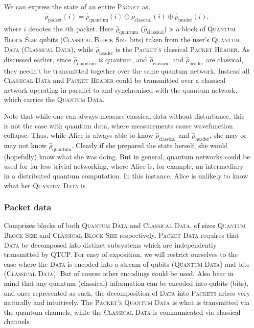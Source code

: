 \documentclass[aps, rmp, twocolumn, amsmath, amssymb, nofootinbib, superscriptaddress, longbibliography, floatfix, table-of-contents, eqsecnum]{revtex4-1}
\begin{document}
We can express the state of an entire \textsc{Packet} as,
\begin{align}
\hat\rho_\text{packet}(i) = \hat\rho_\text{quantum}(i) \oplus \hat\rho_\text{classical}(i) \oplus \hat\rho_\text{header}(i),
\end{align}
where $i$ denotes the $i$th packet. Here $\hat\rho_\text{quantum}$ ($\hat\rho_\text{classical}$) is a block of \textsc{Quantum Block Size} qubits (\textsc{Classical Block Size} bits) taken from the user's \textsc{Quantum Data} (\textsc{Classical Data}), while $\hat\rho_\text{header}$ is the \textsc{Packet's} classical \textsc{Packet Header}. As discussed earlier, since $\hat\rho_\text{quantum}$ is quantum, and $\hat\rho_\text{classical}$ and $\hat\rho_\text{header}$ are classical, they needn't be transmitted together over the same quantum network. Instead all \textsc{Classical Data} and \textsc{Packet Header} could be transmitted over a classical network operating in parallel to and synchronised with the quantum network, which carries the \textsc{Quantum Data}.

Note that while one can always measure classical data without disturbance, this is not the case with quantum data, where measurements cause wavefunction collapse. Thus, while Alice is always able to know $\hat\rho_\text{classical}$ and $\hat\rho_\text{header}$, she may or may not know $\hat\rho_\text{quantum}$. Clearly if she prepared the state herself, she would (hopefully) know what she was doing. But in general, quantum networks could be used for far less trivial networking, where Alice is, for example, an intermediary in a distributed quantum computation. In this instance, Alice is unlikely to know what her \textsc{Quantum Data} is.

%
%

\subsubsection{Packet data} 

Comprises blocks of both \textsc{Quantum Data} and \textsc{Classical Data}, of sizes \textsc{Quantum Block Size} and \textsc{Classical Block Size} respectively. \textsc{Packet Data} requires that \textsc{Data} be decomposed into distinct subsystems which are independently transmitted by QTCP. For easy of exposition, we will restrict ourselves to the case where the \textsc{Data} is encoded into a stream of qubits (\textsc{Quantum Data}) and bits (\textsc{Classical Data}). But of course other encodings could be used. Also bear in mind that any quantum (classical) information can be encoded into qubits (bits), and once represented as such, the decomposition of \textsc{Data} into \textsc{Packets} arises very naturally and intuitively. The \textsc{Packet's} \textsc{Quantum Data} is what is transmitted via the quantum channels, while the \textsc{Classical Data} is communicated via classical channels.
\end{document}
